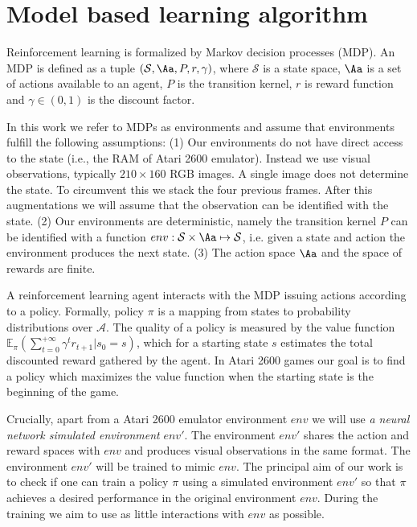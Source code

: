 \section{Model based learning algorithm}
\label{subsec:model}

Reinforcement learning is formalized by Markov decision processes (MDP). An MDP is defined as a tuple $(\mathcal{S}, \Aa, P, r, \gamma)$, where $\mathcal{S}$ is a state space, $\Aa$ is a set of actions available to an agent, $P$ is the transition kernel, $r$ is reward function and $\gamma\in (0,1)$ is the discount factor. 

In this work we refer to MDPs as environments and assume that environments fulfill the following assumptions:
(1) Our environments do not have direct access to the state (i.e., the RAM of Atari 2600 emulator). Instead we use visual observations, typically $210\times 160$ RGB images. A single image does not determine the state. To circumvent this we stack the four previous frames. After this augmentations we will assume that the observation can be identified with the state.
(2) Our environments are deterministic, namely the transition kernel $P$ can be identified with a function $env:\mathcal{S}\times \Aa\mapsto \mathcal{S}$, i.e. given a state and action the environment produces the next state.
(3) The action space $\Aa$ and the space of rewards are finite. 

A reinforcement learning agent interacts with the MDP issuing actions according to a policy. Formally, policy $\pi$ is a mapping from states to probability distributions over $\mathcal{A}$. The quality of a policy is measured by the value function $\mathbb{E}_{\pi}\left(\sum_{t=0}^{+\infty}\gamma^t r_{t+1}|s_0=s \right)$, which for a starting state $s$ estimates the total discounted reward gathered by the agent. In Atari 2600 games our goal is to find a policy which maximizes the value function when the starting state is the beginning of the game.

Crucially, apart from a Atari 2600 emulator environment $env$ we will use \textit{a neural network simulated environment} $env'$. The environment $env'$ shares the action and reward spaces with $env$ and produces visual observations in the same format. The  environment $env'$ will be trained to mimic $env$.  The principal aim of our work is to check
if one can 
train a policy $\pi$ using a simulated environment $env'$ so that $\pi$ achieves a desired performance in the original environment $env$. During the training we aim to use as little interactions with $env$ as possible. 


